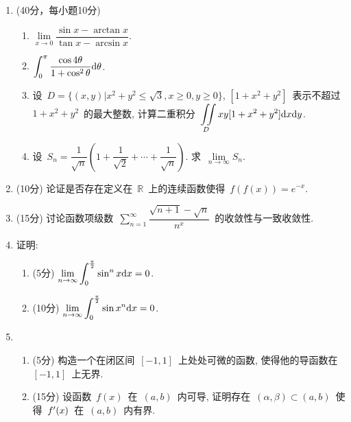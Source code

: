 \documentclass[UTF8,a4paper,11pt]{article}
\begin{document}
\begin{enumerate}
	\item (40分，每小题10分)
	      \begin{enumerate}
		      \item $\lim\limits_{x\to 0}\dfrac{\sin{x}-\arctan{x}}{\tan{x}-\arcsin{x}}$.
		            \vspace{2em}
		      \item $\displaystyle\int_0^{\pi}\dfrac{\cos{4\theta}}{1+\cos^2\theta}\mathrm{d}\theta$.
		            \vspace{2em}
		      \item 设~$D=\{(x,y)|x^2+y^2\leqslant\sqrt{3},x\geqslant 0,y\geqslant 0\}$, $[1+x^2+y^2]$~表示不超过~$1+x^2+y^2$~的最大整数, 计算二重积分~$\displaystyle\iint\limits_D xy[1+x^2+y^2]\mathrm{d}x\mathrm{d}y$.
		            \vspace{2em}
		      \item 设~$S_n=\dfrac{1}{\sqrt{n}}\left(1+\dfrac{1}{\sqrt{2}}+\cdots+\dfrac{1}{\sqrt{n}}\right)$. 求~$\lim\limits_{n\to\infty} S_n$.
		            \vspace{2em}
	      \end{enumerate}
	\item (10分) 论证是否存在定义在~$\mathbb{R}$~上的连续函数使得~$f(f(x))=e^{-x}$.
	      \vspace{2em}
	\item (15分) 讨论函数项级数~$\sum\limits_{n=1}^{\infty} \dfrac{\sqrt{n+1}-\sqrt{n}}{n^x}$~的收敛性与一致收敛性.
	      \vspace{2em}
	\item 证明:
	      \begin{enumerate}
		      \item (5分) $\displaystyle\lim\limits_{n\to\infty}\int_0^{\frac{\pi}{2}}\sin^n{x}\mathrm{d}x=0$.
		      \item (10分) $\displaystyle\lim\limits_{n\to\infty}\int_0^{\frac{\pi}{2}}\sin{x^n}\mathrm{d}x=0$.
	      \end{enumerate}
	      \vspace{2em}
	\item
	      \begin{enumerate}
		      \item (5分) 构造一个在闭区间~$[-1,1]$~上处处可微的函数, 使得他的导函数在~$[-1,1]$~上无界.
		      \item (15分) 设函数~$f(x)$~在~$(a,b)$~内可导, 证明存在~$(\alpha,\beta)\subset(a,b)$~使得~$f\rq{}(x)$~在~$(a,b)$~内有界.
	      \end{enumerate}

\end{enumerate}
\end{document}
